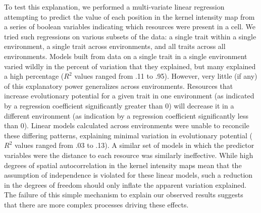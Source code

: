 \documentclass[letterpaper]{article}
\begin{document}
To test this explanation, we performed a multi-variate linear regression attempting to predict the value of each position in the kernel intensity map from a series of boolean variables indicating which resources were present in a cell. We tried such regressions on various subsets of the data: a single trait within a single environment, a single trait across environments, and all traits across all environments. Models built from data on a single trait in a single environment varied wildly in the percent of variation that they explained, but many explained a high percentage ($R^{2}$ values ranged from .11 to .95). However, very little (if any) of this explanatory power generalizes across environments. Resources that increase evolutionary potential for a given trait in one environment (as indicated by a regression coefficient significantly greater than 0) will decrease it in a different environment (as indication by a regression coefficient significantly less than 0). Linear models calculated across environments were unable to reconcile these differing patterns, explaining minimal variation in evolutionary potential ($R^{2}$ values ranged from .03 to .13). A similar set of models in which the predictor variables were the distance to each resource was similarly ineffective. While high degrees of spatial autocorrelation in the kernel intensity maps mean that the assumption of independence is violated for these linear models, such a reduction in the degrees of freedom should only inflate the apparent variation explained. The failure of this simple mechanism to explain our observed results suggests that there are more complex processes driving these effects.
\end{document}
